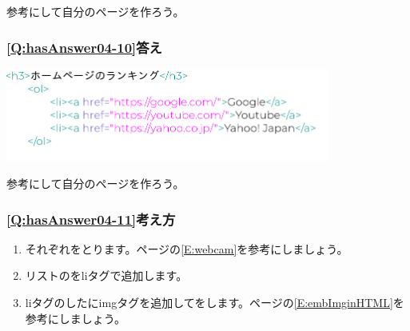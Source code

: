 \documentclass[a4paper,12pt]{jarticle}
\begin{document}
\bigskip

参考にして自分のページを作ろう。


\bigskip

\subsubsection{\bfseries
\ref*{Q:hasAnswer04-10}答え}


\centering
\includegraphics[width=0.8\textwidth]{textbook-img241.png}
\flushleft

\bigskip

\centering
{}
\flushleft

\bigskip
参考にして自分のページを作ろう。

\clearpage\subsubsection{\bfseries
\ref*{Q:hasAnswer04-11}考え方}

\begin{enumerate}
  \item
        それぞれをとります。\pageref*{E:webcam}ページの\ref*{E:webcam}を参考にしましょう。
  \item リストのをliタグで追加します。
  \item
        liタグのしたにimgタグを追加してをします。\pageref*{E:embImginHTML}ページの\ref*{E:embImginHTML}を参考にしましょう。
\end{enumerate}
\centering
{}
\flushleft
\end{document}
